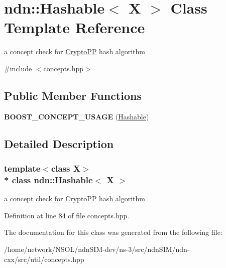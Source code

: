 \hypertarget{classndn_1_1Hashable}{}\section{ndn\+:\+:Hashable$<$ X $>$ Class Template Reference}
\label{classndn_1_1Hashable}


a concept check for \hyperlink{namespaceCryptoPP}{Crypto\+PP} hash algorithm  




{\ttfamily \#include $<$concepts.\+hpp$>$}

\subsection*{Public Member Functions}
\begin{DoxyCompactItemize}
\item 
{\bfseries B\+O\+O\+S\+T\+\_\+\+C\+O\+N\+C\+E\+P\+T\+\_\+\+U\+S\+A\+GE} (\hyperlink{classndn_1_1Hashable}{Hashable})\hypertarget{classndn_1_1Hashable_a9f1428a761fab7095ddcf789c25e8780}{}\label{classndn_1_1Hashable_a9f1428a761fab7095ddcf789c25e8780}

\end{DoxyCompactItemize}


\subsection{Detailed Description}
\subsubsection*{template$<$class X$>$\\*
class ndn\+::\+Hashable$<$ X $>$}

a concept check for \hyperlink{namespaceCryptoPP}{Crypto\+PP} hash algorithm 

Definition at line 84 of file concepts.\+hpp.



The documentation for this class was generated from the following file\+:\begin{DoxyCompactItemize}
\item 
/home/network/\+N\+S\+O\+L/ndn\+S\+I\+M-\/dev/ns-\/3/src/ndn\+S\+I\+M/ndn-\/cxx/src/util/concepts.\+hpp\end{DoxyCompactItemize}
